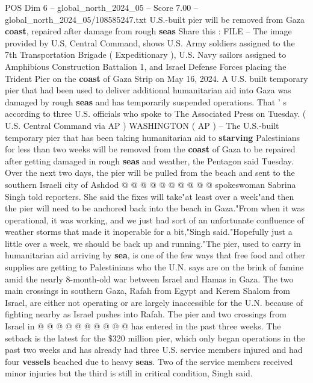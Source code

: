 \begin{textsample}{POS Dim 6 – global\_north\_2024\_05 – Score 7.00 – global\_north\_2024\_05/108585247.txt}  \label{ex:f6_pos_165}
U.S.-built pier will be removed from Gaza \textbf{coast}, repaired after damage from rough \textbf{seas} Share this : FILE -- The image provided by U.S, Central Command, shows U.S.
Army soldiers assigned to the 7th Transportation Brigade ( Expeditionary ), U.S.
Navy sailors assigned to Amphibious Construction Battalion 1, and Israel Defense Forces placing the Trident Pier on the \textbf{coast} of Gaza Strip on May 16, 2024.
A U.S. built temporary pier that had been used to deliver additional humanitarian aid into Gaza was damaged by rough \textbf{seas} and has temporarily suspended operations.
That ' s according to three U.S. officials who spoke to The Associated Press on Tuesday. ( U.S.
Central Command via AP ) WASHINGTON ( AP ) -- The U.S.-built temporary pier that has been taking humanitarian aid to \textbf{starving} Palestinians for less than two weeks will be removed from the \textbf{coast} of Gaza to be repaired after getting damaged in rough \textbf{seas} and weather, the Pentagon said Tuesday.
Over the next two days, the pier will be pulled from the beach and sent to the southern Israeli city of Ashdod @ @ @ @ @ @ @ @ @ @ spokeswoman Sabrina Singh told reporters.
She said the fixes will take"at least over a week"and then the pier will need to be anchored back into the beach in Gaza."From when it was operational, it was working, and we just had sort of an unfortunate confluence of weather storms that made it inoperable for a bit,"Singh said."Hopefully just a little over a week, we should be back up and running."The pier, used to carry in humanitarian aid arriving by \textbf{sea}, is one of the few ways that free food and other supplies are getting to Palestinians who the U.N. says are on the brink of famine amid the nearly 8-month-old war between Israel and Hamas in Gaza.
The two main crossings in southern Gaza, Rafah from Egypt and Kerem Shalom from Israel, are either not operating or are largely inaccessible for the U.N. because of fighting nearby as Israel pushes into Rafah.
The pier and two crossings from Israel in @ @ @ @ @ @ @ @ @ @ has entered in the past three weeks.
The setback is the latest for the \$320 million pier, which only began operations in the past two weeks and has already had three U.S. service members injured and had four \textbf{vessels} beached due to heavy \textbf{seas}.
Two of the service members received minor injuries but the third is still in critical condition, Singh said.

\end{textsample}
